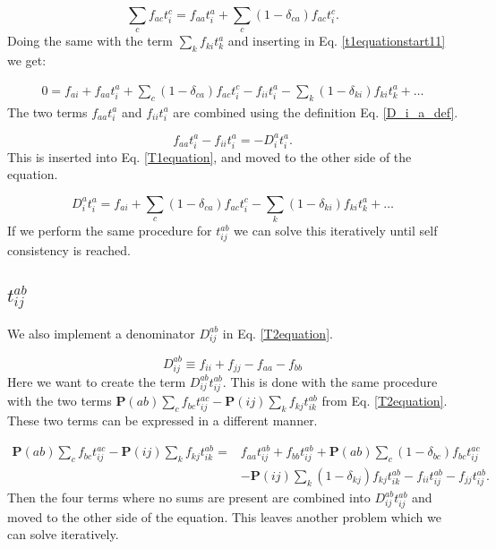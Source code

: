 \begin{equation}
\sum_c f_{ac} t_i^c = f_{aa} t_i^a + \sum_c 
(1 - \delta_{ca} ) f_{ac} t_i^c .
\end{equation}
Doing the same with the term $\sum_k f_{ki} t_k^a$ and inserting in Eq. \eqref{t1equationstart11} we get:

\begin{align}
0 = f_{ai} + f_{aa} t_i^a + \sum_c 
(1 - \delta_{ca} ) f_{ac} t_i^c - f_{ii} t_i^a - \sum_k (1 - \delta_{ki}) f_{ki} t_k^a + \dots \nonumber
\end{align}
The two terms $f_{aa} t_i^a$ and $f_{ii} t_i^a$ are combined using the definition Eq. \eqref{D_i_a_def}. 

\begin{equation}
f_{aa} t_i^a - f_{ii} t_i^a = -D_i^a t_i^a .
\end{equation}
This is inserted into Eq. \eqref{T1equation}, and moved to the other side of the equation.

\begin{equation}
D_i^a t_i^a = f_{ai} + \sum_c 
(1 - \delta_{ca} ) f_{ac} t_i^c - \sum_k (1 - \delta_{ki}) f_{ki} t_k^a + \dots
\end{equation}
If we perform the same procedure for $t_{ij}^{ab}$ we can solve this iteratively until self consistency is reached.

\subsection{$t_{ij}^{ab}$}
We also implement a denominator $D_{ij}^{ab}$ in Eq. \eqref{T2equation}. 

\begin{equation}
D_{ij}^{ab} \equiv f_{ii} + f_{jj} - f_{aa} - f_{bb}
\end{equation}
Here we want to create the term $D_{ij}^{ab} t_{ij}^{ab}$. This is done with the same procedure with the two terms $\textbf{P}(ab) \sum_c f_{bc} t_{ij}^{ac}
- \textbf{P}(ij) \sum_k f_{kj} t_{ik}^{ab}$ from Eq. \eqref{T2equation}. These two terms can be expressed in a different manner.

\begin{align}
\textbf{P}(ab) \sum_c f_{bc} t_{ij}^{ac}
- \textbf{P}(ij) \sum_k f_{kj} t_{ik}^{ab} = & 
f_{aa} t_{ij}^{ab} + f_{bb} t_{ij}^{ab} + 
\textbf{P}(ab) \sum_c (1-\delta_{bc}) f_{bc} t_{ij}^{ac} \nonumber \\ &
- \textbf{P}(ij) \sum_k (1-\delta_{kj}) f_{kj} t_{ik}^{ab}
- f_{ii} t_{ij}^{ab}
- f_{jj} t_{ij}^{ab} . \nonumber
\end{align}
Then the four terms where no sums are present are combined into $D_{ij}^{ab} t_{ij}^{ab}$ and moved to the other side of the equation. This leaves another problem which we can solve iteratively.

